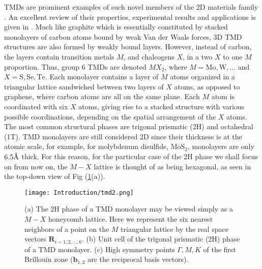 \acp{TMD} are prominent examples of such novel members of the \ac{2D} materials family \cite{wang_electronics_2012, roldan_electronic_2014, xu_spin_2014}.
An excellent review of their properties, experimental results and applications is given in \cite{manzeli_2d_2017}.
Much like graphite which is essentially constituted by stacked monolayers of carbon atoms bound by weak Van der Waals forces, 3D \ac{TMD} structures are also formed by weakly bound layers.
However, instead of carbon, the layers contain transition metals $M$, and chalcogens $X$, in a two $X$ to one $M$ proportion.
Thus, group 6 \acp{TMD} are denoted $MX_2$, where $M = \text{Mo}, \text{W}, ...$ and $X = \text{S}, \text{Se}, \text{Te}$.
Each monolayer contains a layer of $M$ atoms organized in a triangular lattice sandwiched between two layers of $X$ atoms, as opposed to graphene, where carbon atoms are all on the same plane.
Each $M$ atom is coordinated with six $X$ atoms, giving rise to a stacked structure with various possible coordinations, depending on the spatial arrangement of the $X$ atoms.
The most common structural phases are trigonal prismatic (2H) and octahedral (1T).
\ac{TMD} monolayers are still considered \ac{2D} since their thickness is at the atomic scale, for example, for molybdenum disulfide, $\text{Mo} \text{S}_2$, monolayers are only $ 6.5 \textup{\AA}$ thick.
For this reason, for the particular case of the 2H phase we shall focus on from now on, the $M-X$ lattice is thought of as being hexagonal, as seen in the top-down view of Fig (\ref{fig:tmdHex}(a)).

\begin{figure}[H]
\centering
\texttt{[image: Introduction/tmd2.png]}
 \caption[\ac{TMD} monolayer condensing in its 2H phase.
 $M-X$ honeycomb lattice.
 Unit cell of the trigonal prismatic (2H) phase of a \ac{TMD} monolayer.
 High symmetry points of the corresponding hexagonal lattice's  reciprocal space.]{(a) The 2H phase of a  \ac{TMD} monolayer may be viewed simply as a $M-X$ honeycomb lattice. Here we represent the six nearest neighbors of a point on the $M$ triangular lattice by the real space vectors $\bm R_{i = 1,2,..., 6}$.
(b) Unit cell of the trigonal prismatic (2H) phase of a \ac{TMD} monolayer.
(c) High symmetry points $\Gamma, M, K$ of the first Brillouin zone ($\bm b_{1,2}$ are the reciprocal basis vectors).\label{fig:tmdHex}}
\end{figure}

